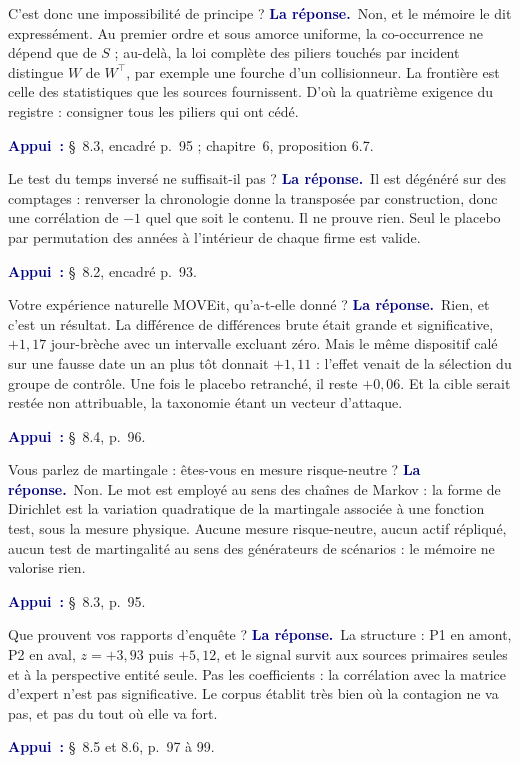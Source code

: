 \documentclass[11pt,a4paper]{article}
\newcommand{\rep}[1]{\smallskip\noindent\textcolor{navy}{\textbf{La réponse.}}\ #1\par}
\newcommand{\appui}[1]{\smallskip\noindent\small\textcolor{navy}{\textbf{Appui~:}} #1\par\normalsize}
\begin{document}
\begin{question}{\og C'est donc une impossibilité de principe ?\fg{}}
\rep{Non, et le mémoire le dit expressément. Au premier ordre et sous amorce uniforme, la
co-occurrence ne dépend que de $S$ ; au-delà, la loi complète des piliers touchés par incident
distingue $W$ de $W^\top$, par exemple une fourche d'un collisionneur. La frontière est celle des
statistiques que les sources fournissent. D'où la quatrième exigence du registre : consigner tous
les piliers qui ont cédé.}
\appui{\S~8.3, encadré p.~95 ; chapitre~6, proposition 6.7.}
\end{question}

\begin{question}{\og Le test du temps inversé ne suffisait-il pas ?\fg{}}
\rep{Il est dégénéré sur des comptages : renverser la chronologie donne la transposée par
construction, donc une corrélation de $-1$ quel que soit le contenu. Il ne prouve rien. Seul le
placebo par permutation des années à l'intérieur de chaque firme est valide.}
\appui{\S~8.2, encadré p.~93.}
\end{question}

\begin{question}{\og Votre expérience naturelle MOVEit, qu'a-t-elle donné ?\fg{}}
\rep{Rien, et c'est un résultat. La différence de différences brute était grande et
significative, $+1{,}17$ jour-brèche avec un intervalle excluant zéro. Mais le même dispositif calé
sur une fausse date un an plus tôt donnait $+1{,}11$ : l'effet venait de la sélection du groupe de
contrôle. Une fois le placebo retranché, il reste $+0{,}06$. Et la cible serait restée non
attribuable, la taxonomie étant un vecteur d'attaque.}
\appui{\S~8.4, p.~96.}
\end{question}

\begin{question}{\og Vous parlez de martingale : êtes-vous en mesure risque-neutre ?\fg{}}
\rep{Non. Le mot est employé au sens des chaînes de Markov : la forme de Dirichlet est la
variation quadratique de la martingale associée à une fonction test, sous la mesure physique.
Aucune mesure risque-neutre, aucun actif répliqué, aucun test de martingalité au sens des
générateurs de scénarios : le mémoire ne valorise rien.}
\appui{\S~8.3, p.~95.}
\end{question}

\begin{question}{\og Que prouvent vos rapports d'enquête ?\fg{}}
\rep{La structure : P1 en amont, P2 en aval, $z=+3{,}93$ puis $+5{,}12$, et le signal survit aux
sources primaires seules et à la perspective entité seule. Pas les coefficients : la corrélation
avec la matrice d'expert n'est pas significative. Le corpus établit très bien où la contagion ne
va pas, et pas du tout où elle va fort.}
\appui{\S~8.5 et 8.6, p.~97 à 99.}
\end{question}
\end{document}
